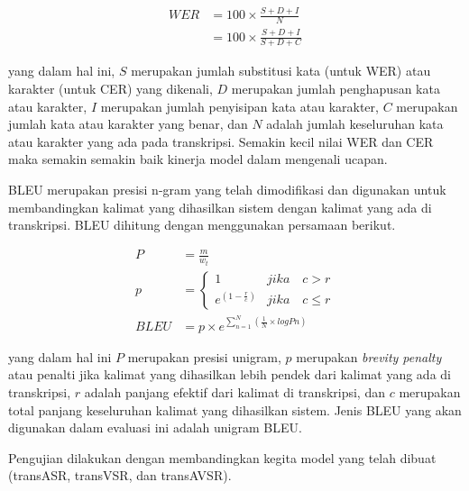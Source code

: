 \begin{equation*}
    \begin{split}
        WER &= 100 \times \frac{S + D + I}{N} \\
        &= 100 \times \frac{S + D + I}{S + D + C}
    \end{split}
\end{equation*}

yang dalam hal ini, \(S\) merupakan jumlah substitusi kata (untuk WER) atau karakter (untuk CER) yang dikenali, \(D\) merupakan jumlah penghapusan kata atau karakter, \(I\) merupakan jumlah penyisipan kata atau karakter, \(C\) merupakan jumlah kata atau karakter yang benar, dan \(N\) adalah jumlah keseluruhan kata atau karakter yang ada pada transkripsi. Semakin kecil nilai WER dan CER maka semakin semakin baik kinerja model dalam mengenali ucapan.
\bigskip

BLEU merupakan presisi n-gram yang telah dimodifikasi dan digunakan untuk membandingkan kalimat yang dihasilkan sistem dengan kalimat yang ada di transkripsi. BLEU dihitung dengan menggunakan persamaan berikut.

\begin{equation*}
    \begin{split}
        P &= \frac{m}{w_t}\\
        p &= \begin{cases}
            1                      & jika \quad c>r \\
            e^{(1-\frac{r}{c})}    & jika \quad c \leq r
        \end{cases} \\
        BLEU &= p \times e^{\sum_{n=1}^{N} (\frac{1}{N}\times log Pn)}
    \end{split}
\end{equation*}

yang dalam hal ini \(P\) merupakan presisi unigram, \(p\) merupakan \textit{brevity penalty} atau penalti jika kalimat yang dihasilkan lebih pendek dari kalimat yang ada di transkripsi, \(r\) adalah panjang efektif dari kalimat di transkripsi, dan \(c\) merupakan total panjang keseluruhan kalimat yang dihasilkan sistem. Jenis BLEU yang akan digunakan dalam evaluasi ini adalah unigram BLEU.

Pengujian dilakukan dengan membandingkan kegita model yang telah dibuat (transASR, transVSR, dan transAVSR).